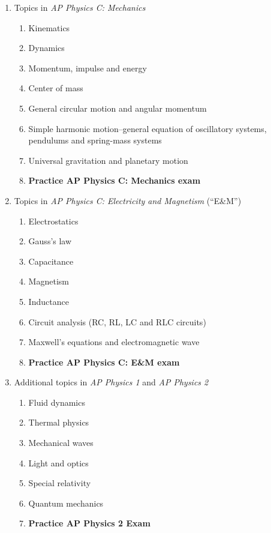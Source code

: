 \documentclass[11pt]{article}
\begin{document}
\begin{enumerate}[itemsep=0pt,leftmargin=15pt]
\item Topics in \emph{AP Physics C: Mechanics}
  \begin{enumerate}[itemsep=0pt,leftmargin=18pt]
  \item Kinematics
  \item Dynamics
  \item Momentum, impulse and energy
  \item Center of mass
  \item General circular motion and angular momentum
  \item Simple harmonic motion--general equation of oscillatory systems,
    pendulums and spring-mass systems
  \item Universal gravitation and planetary motion
  \item\textbf{Practice AP Physics C: Mechanics exam}
  \end{enumerate}
\item Topics in \emph{AP Physics C: Electricity and Magnetism} (``E\&M'')
  \begin{enumerate}[itemsep=0pt,leftmargin=18pt]
  \item Electrostatics
  \item Gauss's law
  \item Capacitance
  \item Magnetism
  \item Inductance
  \item Circuit analysis (RC, RL, LC and RLC circuits)
  \item Maxwell's equations and electromagnetic wave
  \item\textbf{Practice AP Physics C: E\&M exam}
  \end{enumerate}
\item Additional topics in \emph{AP Physics 1} and \emph{AP Physics 2}
  \begin{enumerate}[itemsep=0pt,leftmargin=18pt]
  \item Fluid dynamics
  \item Thermal physics
  \item Mechanical waves
  \item Light and optics
  \item Special relativity
  \item Quantum mechanics
  \item\textbf{Practice AP Physics 2 Exam}
  \end{enumerate}
\end{enumerate}
\end{document}
